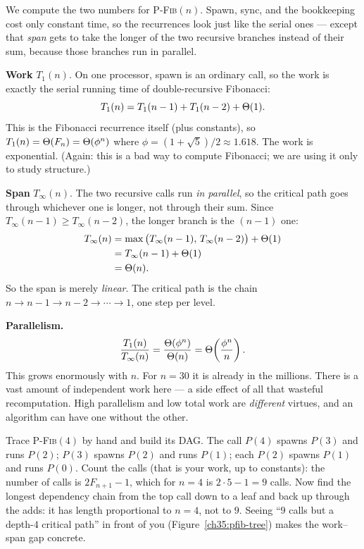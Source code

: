 We compute the two numbers for \textsc{P-Fib}$(n)$. Spawn, sync, and the
bookkeeping cost only constant time, so the recurrences look just like the serial
ones --- except that \emph{span} gets to take the longer of the two recursive
branches instead of their sum, because those branches run in parallel.

\textbf{Work} $T_1(n)$. On one processor, spawn is an ordinary call, so the
work is exactly the serial running time of double-recursive Fibonacci:
\[
T_1(n) = T_1(n-1) + T_1(n-2) + \Theta(1).
\]
This is the Fibonacci recurrence itself (plus constants), so $T_1(n) =
\Theta(F_n) = \Theta(\phi^n)$ where $\phi = (1+\sqrt5)/2 \approx 1.618$. The work is
exponential. (Again: this is a bad way to compute Fibonacci; we are using it only
to study structure.)

\textbf{Span} $T_\infty(n)$. The two recursive calls run \emph{in parallel}, so
the critical path goes through whichever one is longer, not through their sum.
Since $T_\infty(n-1) \ge T_\infty(n-2)$, the longer branch is the $(n-1)$ one:
\begin{align*}
T_\infty(n) &= \max\big(T_\infty(n-1),\, T_\infty(n-2)\big) + \Theta(1) \\
&= T_\infty(n-1) + \Theta(1) \\
&= \Theta(n).
\end{align*}
So the span is merely \emph{linear}. The critical path is the chain $n \to n-1 \to
n-2 \to \cdots \to 1$, one step per level.

\textbf{Parallelism.}
\[
\frac{T_1(n)}{T_\infty(n)} = \frac{\Theta(\phi^n)}{\Theta(n)} = \Theta\!\left(\frac{\phi^n}{n}\right).
\]
This grows enormously with $n$. For $n=30$ it is already in the millions. There is
a vast amount of independent work here --- a side effect of all that
wasteful recomputation. High parallelism and low total work
are \emph{different} virtues, and an algorithm can have one without the other.

\begin{labbox}
Trace \textsc{P-Fib}$(4)$ by hand and build its DAG. The call $P(4)$ spawns
$P(3)$ and runs $P(2)$; $P(3)$ spawns $P(2)$ and runs $P(1)$; each $P(2)$ spawns
$P(1)$ and runs $P(0)$. Count the calls (that is your work, up to constants):
the number of calls is $2F_{n+1}-1$, which for $n=4$ is $2\cdot 5 - 1 = 9$ calls.
Now find the longest dependency chain from the top call down to a leaf and back up
through the adds: it has length proportional to $n=4$, not to $9$. Seeing ``$9$
calls but a depth-$4$ critical path'' in front of you (Figure~\ref{ch35:pfib-tree})
makes the work--span gap concrete.
\end{labbox}

